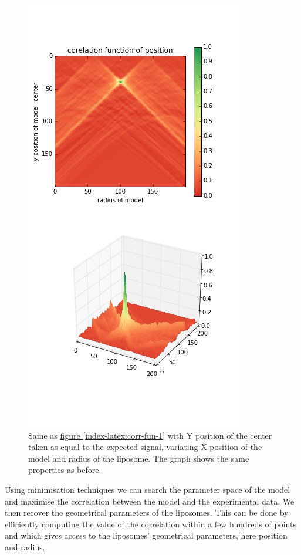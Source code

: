 \documentclass[A4paperpaper,11pt,english]{sphinxmanual}
\begin{document}
\begin{figure}[htbp]
\centering
\capstart

\includegraphics[width=0.600\linewidth]{c-R-_100-by-100-RC-40_0-noise-0_5-delta-4_0_.png}
\caption{Same as \hyperref[index-latex:corr-fun-1]{figure  \ref*{index-latex:corr-fun-1}}  with Y position of the center taken
as equal to the expected signal, variating X position of the model and
radius of the liposome. The graph shows the same properties as before.}\label{index-latex:corr-fun-2}\end{figure}

Using minimisation techniques we can search the parameter space of the model and
maximise the correlation between the model and the experimental data. We then
recover the geometrical parameters of the liposomes. This can be done by
efficiently computing the value of the correlation within a few hundreds of
points and which gives access to the liposomes' geometrical parameters, here position
and radius.
\end{document}
